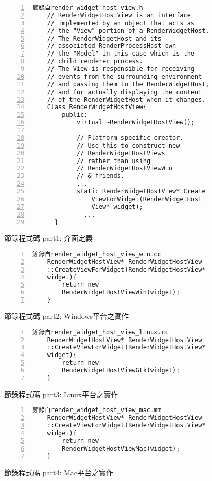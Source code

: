 \begin{figure}
\linespread{0.8}
\begin{Verbatim}[numbers=left,framesep=1mm,numbersep=-12pt]
	節錄自render_widget_host_view.h
	// RenderWidgetHostView is an interface 
	// implemented by an object that acts as
	// the "View" portion of a RenderWidgetHost.
	// The RenderWidgetHost and its
	// associated RenderProcessHost own
	// the "Model" in this case which is the
	// child renderer process.
	// The View is responsible for receiving
	// events from the surrounding environment
	// and passing them to the RenderWidgetHost,
	// and for actually displaying the content
	// of the RenderWidgetHost when it changes.
	Class RenderWidgetHostView{
	    public:
	        virtual ~RenderWidgetHostView();
	        
	        // Platform-specific creator.
	        // Use this to construct new 
	        // RenderWidgetHostViews
	        // rather than using 
	        // RenderWidgetHostViewWin 
	        // & friends.
	        ...
	        static RenderWidgetHostView* Create
	            ViewForWidget(RenderWidgetHost
	            View* widget);
	          ...
	  }
\end{Verbatim}
\caption{節錄程式碼 part1: 介面定義}
\label{interfacedef}
\end{figure}
\begin{figure}
\linespread{0.8}
\begin{Verbatim}[numbers=left,framesep=1mm,numbersep=-12pt]
	節錄自render_widget_host_view_win.cc 
	RenderWidgetHostView* RenderWidgetHostView
	::CreateViewForWidget(RenderWidgetHostView*
	widget){
	    return new 
	    RenderWidgetHostViewWin(widget);
	}
\end{Verbatim}
\caption{節錄程式碼 part2: Windows平台之實作}
\label{windowsimple}
\end{figure}
\begin{figure}
\linespread{0.8}
\begin{Verbatim}[numbers=left,framesep=1mm,numbersep=-12pt]
	節錄自render_widget_host_view_linux.cc
	RenderWidgetHostView* RenderWidgetHostView
	::CreateViewForWidget(RenderWidgetHostView*
	widget){
	    return new 
	    RenderWidgetHostViewGtk(widget);
	}
\end{Verbatim}
\caption{節錄程式碼 part3: Linux平台之實作}
\label{linuximpl}
\end{figure}
\begin{figure}
\linespread{0.8}
\begin{Verbatim}[numbers=left,framesep=1mm,numbersep=-12pt]
	節錄自render_widget_host_view_mac.mm
	RenderWidgetHostView* RenderWidgetHostView
	::CreateViewForWidget(RenderWidgetHostView*
	widget){
	    return new 
	    RenderWidgetHostViewMac(widget);
	}
\end{Verbatim}
\caption{節錄程式碼 part4: Mac平台之實作}
\label{macimpl}
\end{figure}

